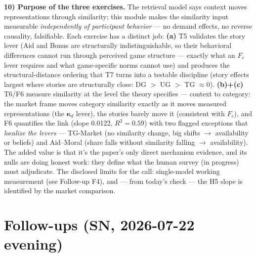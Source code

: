 \documentclass[11pt]{article}
\begin{document}
\textbf{10) Purpose of the three exercises.} The retrieval model says context moves representations through similarity; this module makes the similarity input measurable \emph{independently of participant behavior} --- no demand effects, no reverse causality, falsifiable. Each exercise has a distinct job: \textbf{(a)} T5 validates the story lever (Aid and Bonus are structurally indistinguishable, so their behavioral differences cannot run through perceived game structure --- exactly what an $F_c$ lever requires and what game-specific norms cannot use) and produces the structural-distance ordering that T7 turns into a testable discipline (story effects largest where stories are structurally close: DG $>$ UG $>$ TG $\approx 0$). \textbf{(b)+(c)} T6/F6 measure similarity at the level the theory specifies --- context to category: the market frame moves category similarity exactly as it moves measured representations (the $\boldsymbol{\kappa}_d$ lever), the stories barely move it (consistent with $F_c$), and F6 quantifies the link (slope 0.0122, $R^2 = 0.59$) with two flagged exceptions that \emph{localize the levers} --- TG-Market (no similarity change, big shifts $\to$ availability or beliefs) and Aid--Moral (share falls without similarity falling $\to$ availability). The added value is that it's the paper's only direct mechanism evidence, and its nulls are doing honest work: they define what the human survey (in progress) must adjudicate. The disclosed limits for the call: single-model working measurement (see Follow-up F4), and --- from today's check --- the H5 slope is identified by the market comparison.

\section*{Follow-ups (SN, 2026-07-22 evening)}
\end{document}
